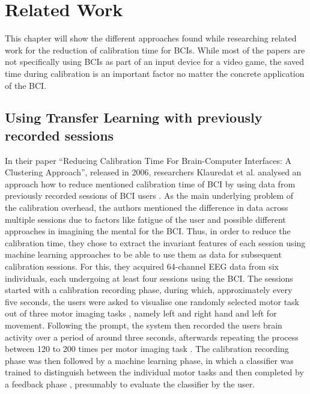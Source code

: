 \chapter{Related Work}
\label{chap:relWork}

This chapter will show the different approaches found while researching related work for the reduction of calibration time for BCIs. %
While most of the papers %
are not specifically using BCIs as part of an input device for a video game, the saved time during calibration is an important factor no matter the concrete application of the BCI.

\section{Using Transfer Learning with previously recorded sessions}
\label{sec:relWork:TL}

In their paper ``Reducing Calibration Time For Brain-Computer Interfaces: A Clustering Approach'', released in 2006, researchers Klauredat et al. analysed an approach how to reduce mentioned calibration time of BCI by using data from previously recorded sessions of BCI users \cite{krauledat-2007}. 
As the main underlying problem of the calibration overhead, the authors mentioned the difference in data across multiple sessions due to factors like fatigue of the user and possible different approaches in imagining the mental for the BCI. Thus, in order to reduce the calibration time, they chose to extract the invariant features of each session using machine learning approaches to be able to use them as data for subsequent calibration sessions. For this, they acquired 64-channel EEG data from six individuals, each undergoing at least four sessions using the BCI. The sessions started with a calibration recording phase, during which, approximately every five seconds, the users were asked to visualise one randomly selected motor task out of three motor imaging tasks%
, namely left and right hand and left for movement. Following the prompt, the system then recorded the users brain activity over a period of around three seconds, afterwards repeating the process between 120 to 200 times per motor imaging task \cite{krauledat-2007}.
The calibration recording phase was then followed by a machine learning phase, in which a classifier was trained to distinguish between the individual motor tasks and then completed by a feedback phase %
, presumably to evaluate the classifier by the user.

